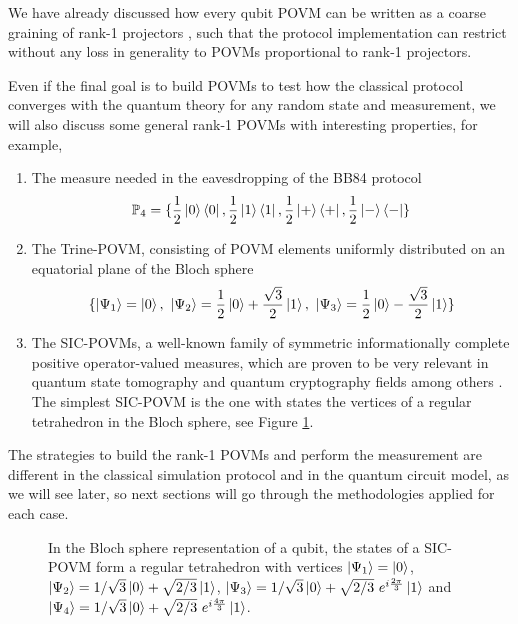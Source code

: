 We have already discussed how every qubit POVM can be written as a coarse graining of rank-1 projectors \cite{barrett2002}, such that the protocol implementation can restrict without any loss in generality to POVMs proportional to rank-1 projectors. 

Even if the final goal is to build POVMs to test how the classical protocol converges with the quantum theory for any random state and measurement, we will also discuss some general rank-1 POVMs with interesting properties, for example, 
\begin{enumerate}
    \item The measure needed in the eavesdropping  of the BB84 protocol \cite{nielsen2000}
\begin{equation}
    \mathbb{P}_4 = \{\frac{1}{2}\ket{0}\bra{0}, \frac{1}{2}\ket{1}\bra{1}, \frac{1}{2}\ket{+}\bra{+}, \frac{1}{2}\ket{-}\bra{-} \}
\end{equation}
    \item The Trine-POVM, consisting of POVM elements uniformly distributed on an equatorial plane of the Bloch sphere
\begin{equation}
\{\ket{\Psi_1}=\ket{0},\ \ket{\Psi_2}=\frac{1}{2}\ket{0} + \frac{\sqrt{3}}{2} \ket{1},\ \ket{\Psi_3}=\frac{1}{2}\ket{0} - \frac{\sqrt{3}}{2} \ket{1}\}
\end{equation}
    \item The SIC-POVMs, a well-known family of symmetric informationally complete positive operator-valued measures, which are proven to be very relevant in quantum state tomography and quantum cryptography fields among others \cite{renes2004}. The simplest SIC-POVM is the one with states the vertices of a regular tetrahedron in the Bloch sphere, see Figure \ref{fig:sic_povm}.
\end{enumerate}

The strategies to build the rank-1 POVMs and perform the measurement are different in the classical simulation protocol and in the quantum circuit model, as we will see later, so next sections will go through the methodologies applied for each case.

\begin{figure}[!ht]
\begin{center}
\centerline{}
\caption[SIC-POVM as tetrahedron in Bloch sphere]%
{\label{fig:sic_povm}%
In the Bloch sphere representation of a qubit, the states of a SIC-POVM form a regular tetrahedron with vertices $\ket{\Psi_1}=\ket{0}$, $\ket{\Psi_2}=1/{\sqrt{3}}\ket{0} + \sqrt{2/3} \ket{1}$, $\ket{\Psi_3}=1/{\sqrt{3}}\ket{0} + \sqrt{2/3} \ e^{i\frac{2\pi}{3}} \ket{1}$ and $\ket{\Psi_4}=1/{\sqrt{3}}\ket{0} + \sqrt{2/3}\ e^{i\frac{4\pi}{3}} \ket{1}$.}
\end{center}
\end{figure}

